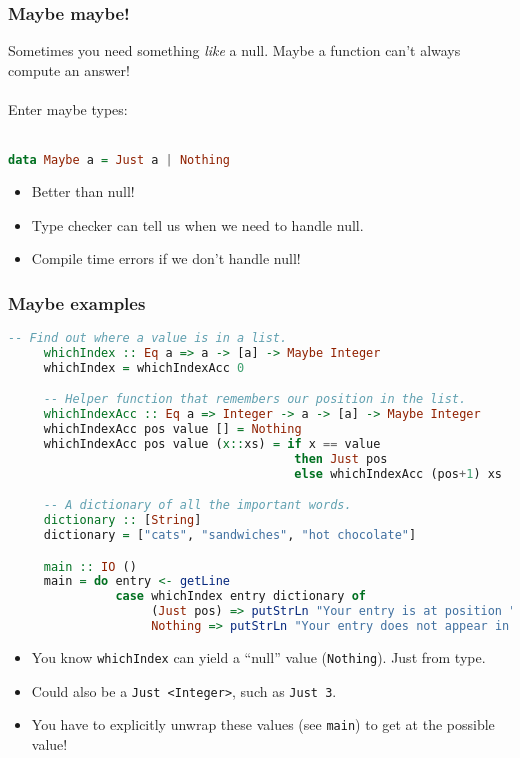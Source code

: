 \documentclass{beamer}
\begin{document}
\begin{frame}[fragile]
  \frametitle{Maybe maybe!}

  Sometimes you need something \emph{like} a null. Maybe a function can't always compute an answer! \\~\\

  \pause
  Enter maybe types: \\~\\

  \begin{lstlisting}[frame=single, language=Haskell, breaklines=true, basicstyle=\ttfamily\tiny]
    data Maybe a = Just a | Nothing
  \end{lstlisting}

  \pause

  \begin{itemize}
  \item Better than null!
  \item Type checker can tell us when we need to handle null.
  \item Compile time errors if we don't handle null!
  \end{itemize}
\end{frame}

\begin{frame}[fragile]
  \frametitle{Maybe examples}

  \begin{lstlisting}[frame=single, language=Haskell, breaklines=true, basicstyle=\ttfamily\tiny]
     -- Find out where a value is in a list.
     whichIndex :: Eq a => a -> [a] -> Maybe Integer
     whichIndex = whichIndexAcc 0

     -- Helper function that remembers our position in the list.
     whichIndexAcc :: Eq a => Integer -> a -> [a] -> Maybe Integer
     whichIndexAcc pos value [] = Nothing
     whichIndexAcc pos value (x::xs) = if x == value
                                        then Just pos
                                        else whichIndexAcc (pos+1) xs

     -- A dictionary of all the important words.
     dictionary :: [String]
     dictionary = ["cats", "sandwiches", "hot chocolate"]

     main :: IO ()
     main = do entry <- getLine
               case whichIndex entry dictionary of
                    (Just pos) => putStrLn "Your entry is at position " ++ show pos ++ " in the dictionary."
                    Nothing => putStrLn "Your entry does not appear in the dictionary."
  \end{lstlisting}

  \begin{itemize}
  \item You know \texttt{whichIndex} can yield a ``null'' value (\texttt{Nothing}). Just from type.
  \item Could also be a \texttt{Just <Integer>}, such as \texttt{Just 3}.
  \item You have to explicitly unwrap these values (see \texttt{main}) to get at the possible value!
  \end{itemize}
\end{frame}
\end{document}
